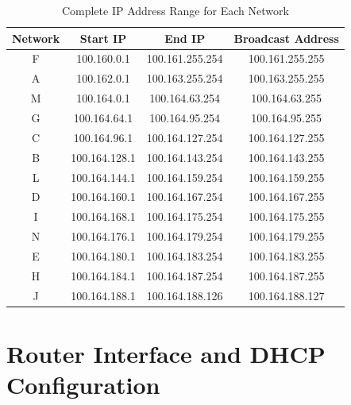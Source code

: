 \documentclass[12pt,a4paper]{article}
\begin{document}
\begin{table}[h]
\centering
\footnotesize
\begin{tabular}{|c|c|c|c|}
\hline
\textbf{Network} & \textbf{Start IP} & \textbf{End IP} & \textbf{Broadcast Address} \\
\hline
F & 100.160.0.1 & 100.161.255.254 & 100.161.255.255 \\
A & 100.162.0.1 & 100.163.255.254 & 100.163.255.255 \\
M & 100.164.0.1 & 100.164.63.254 & 100.164.63.255 \\
G & 100.164.64.1 & 100.164.95.254 & 100.164.95.255 \\
C & 100.164.96.1 & 100.164.127.254 & 100.164.127.255 \\
B & 100.164.128.1 & 100.164.143.254 & 100.164.143.255 \\
L & 100.164.144.1 & 100.164.159.254 & 100.164.159.255 \\
D & 100.164.160.1 & 100.164.167.254 & 100.164.167.255 \\
I & 100.164.168.1 & 100.164.175.254 & 100.164.175.255 \\
N & 100.164.176.1 & 100.164.179.254 & 100.164.179.255 \\
E & 100.164.180.1 & 100.164.183.254 & 100.164.183.255 \\
H & 100.164.184.1 & 100.164.187.254 & 100.164.187.255 \\
J & 100.164.188.1 & 100.164.188.126 & 100.164.188.127 \\
\hline
\end{tabular}
\caption{Complete IP Address Range for Each Network}
\end{table}

\vspace{0.5cm}

\section*{Router Interface and DHCP Configuration}
\end{document}
